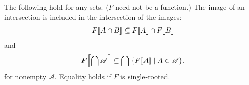 \documentclass{report}
\begin{document}
\subsection{}%
\label{sub:theorem-3k-b}

\begin{theorem}[3K(b)]

  The following hold for any sets. ($F$ need not be a function.)
  The image of an intersection is included in the intersection of the images:
    \begin{equation}
      \label{sub:theorem-3k-b-eq1}
      F\!\left\llbracket A \cap B\right\rrbracket \subseteq F\!\left\llbracket A\right\rrbracket \cap F\!\left\llbracket B\right\rrbracket
    \end{equation}
    and
    \begin{equation}
      \label{sub:theorem-3k-b-eq2}
      F\!\left\llbracket\bigcap\mathscr{A}\right\rrbracket \subseteq
        \bigcap\;\{F\!\left\llbracket A\right\rrbracket \mid A \in \mathscr{A}\}.
    \end{equation}
    for nonempty $\mathscr{A}$.
  Equality holds if $F$ is single-rooted.

\end{theorem}
\end{document}
